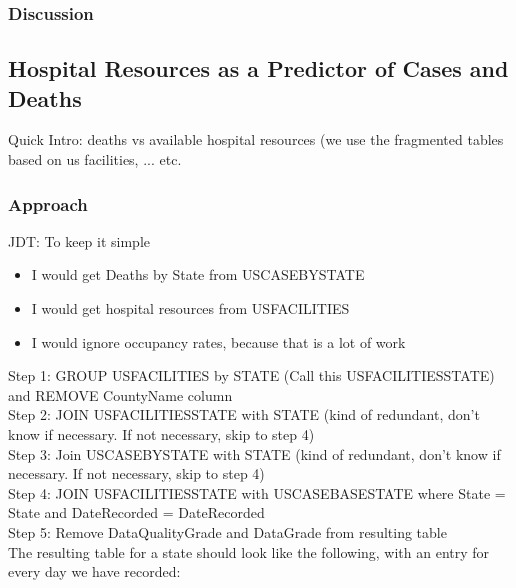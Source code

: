 \documentclass[11pt]{article}
\begin{document}
\subsubsection{Discussion}

\pagebreak

\subsection{Hospital Resources as a Predictor of Cases and Deaths}

\noindent
Quick Intro: deaths vs available hospital resources (we use the fragmented tables based on us facilities,  ... etc.

\subsubsection{Approach}

\noindent
JDT: To keep it simple

\begin{itemize}
    \item I would get Deaths by State from USCASEBYSTATE
    \item I would get hospital resources from USFACILITIES
    \item I would ignore occupancy rates, because that is a lot of work
\end{itemize}

\noindent
Step 1: GROUP USFACILITIES by STATE (Call this USFACILITIESSTATE) and REMOVE CountyName column \\
\noindent
Step 2: JOIN USFACILITIESSTATE with STATE (kind of redundant, don't know if necessary. If not necessary, skip to step 4) \\
\noindent
Step 3: Join USCASEBYSTATE with STATE (kind of redundant, don't know if necessary. If not necessary, skip to step 4) \\
\noindent
Step 4: JOIN USFACILITIESSTATE with USCASEBASESTATE where State = State and DateRecorded = DateRecorded \\
\noindent
Step 5: Remove DataQualityGrade and DataGrade from resulting table \\

\noindent
The resulting table for a state should look like the following, with an entry for every day we have recorded:
\end{document}
